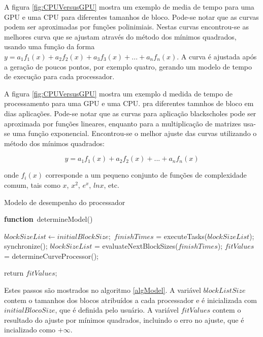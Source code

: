 A figura \ref{fig:CPUVersusGPU} mostra um exemplo de media de tempo para uma GPU e uma CPU para diferentes tamanhos de bloco. Pode-se notar que as curvas podem ser aproximadas por funções polinimiais. Nestas curvas encontrou-se as melhores curva que se ajustam através do método dos mínimos quadrados, usando uma função da forma $y= a_1f_1(x) + a_2f_2(x) + a_3f_3(x) + ... + a_nf_n(x)$. A curva é ajustada após a geração de poucos pontos, por exemplo quatro, gerando um modelo de tempo de execução para cada processador.

A figura \ref{fig:CPUVersusGPU} mostra um exemplo d medida de tempo de processamento para uma GPU e uma CPU. pra diferentes tamnhos de bloco em dias aplicações. Pode-se notar que as curvas para aplicação blackscholes pode ser aproximada por funções lineares, enquanto para a multiplicação de matrizes usa-se uma função exponencial. Encontrou-se o melhor ajuste das curvas utilizando o método dos mínimos quadrados:

\begin{equation}
 y = a_{1} f_{1}(x) +  a_{2} f_{2}(x) + ... + a_{n} f_{n}(x) 
\label{eq: least}
\end{equation} 

onde $f_i(x)$ corresponde a um pequeno conjunto de funções de complexidade comum, tais como $x$, $x^2$, $e^x$, $ln x$, etc. 

\begin{algorithm}

\caption{Modelo de desempenho do processador}
\label{algModel}

\begin{algorithmic}		

\STATE \textbf{function}~determineModel()

\STATE $blockSizeList \leftarrow initialBlockSize;$
		\STATE $finishTimes$ = executeTasks($blockSizeList$);
                \STATE synchronize();
	        \STATE $blockSizeList$ = evaluateNextBlockSizes($finishTimes$);
		\STATE $fitValues$ = determineCurveProcessor();
\ENDWHILE

return $fitValues$;

\end{algorithmic}
\end{algorithm}

Estes passos são mostrados no algoritmo \ref{algModel}. A variável $blockListSize$ contem o tamanhos dos blocos atribuídos a cada processador e é inicializada com $initialBlocoSize$, que é definida  pelo usuário. A variável $fitValues$ contem o resultado do ajuste por mínimos quadrados, incluindo o erro no ajuste, que é incializado como $+\infty$.

